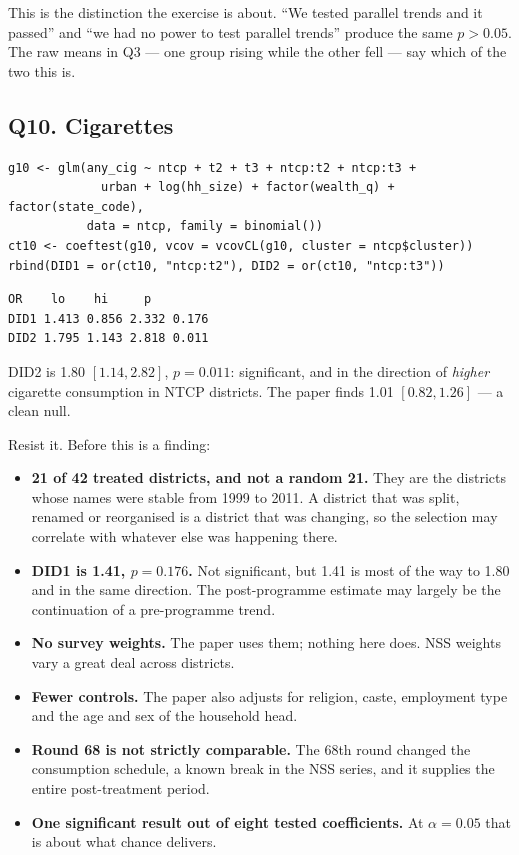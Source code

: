 \documentclass[11pt,a4paper]{article}
\newcommand{\qhead}[1]{\subsection*{#1}\addcontentsline{toc}{subsection}{#1}}
\begin{document}
This is the distinction the exercise is about. ``We tested parallel trends and
it passed'' and ``we had no power to test parallel trends'' produce the same
$p > 0.05$. The raw means in Q3 --- one group rising while the other fell ---
say which of the two this is.

\qhead{Q10. Cigarettes}

\begin{lstlisting}[style=rcode]
g10 <- glm(any_cig ~ ntcp + t2 + t3 + ntcp:t2 + ntcp:t3 +
             urban + log(hh_size) + factor(wealth_q) + factor(state_code),
           data = ntcp, family = binomial())
ct10 <- coeftest(g10, vcov = vcovCL(g10, cluster = ntcp$cluster))
rbind(DID1 = or(ct10, "ntcp:t2"), DID2 = or(ct10, "ntcp:t3"))
\end{lstlisting}

\begin{lstlisting}[style=rout]
        OR    lo    hi     p
DID1 1.413 0.856 2.332 0.176
DID2 1.795 1.143 2.818 0.011
\end{lstlisting}

DID2 is 1.80 $[1.14, 2.82]$, $p = 0.011$: significant, and in the direction of
\emph{higher} cigarette consumption in NTCP districts. The paper finds 1.01
$[0.82, 1.26]$ --- a clean null.

Resist it. Before this is a finding:

\begin{itemize}[leftmargin=*,itemsep=0.25em]
\item \textbf{21 of 42 treated districts, and not a random 21.} They are the
districts whose names were stable from 1999 to 2011. A district that was split,
renamed or reorganised is a district that was changing, so the selection may
correlate with whatever else was happening there.
\item \textbf{DID1 is 1.41, $p = 0.176$.} Not significant, but 1.41 is most of
the way to 1.80 and in the same direction. The post-programme estimate may
largely be the continuation of a pre-programme trend.
\item \textbf{No survey weights.} The paper uses them; nothing here does. NSS
weights vary a great deal across districts.
\item \textbf{Fewer controls.} The paper also adjusts for religion, caste,
employment type and the age and sex of the household head.
\item \textbf{Round 68 is not strictly comparable.} The 68th round changed the
consumption schedule, a known break in the NSS series, and it supplies the
entire post-treatment period.
\item \textbf{One significant result out of eight tested coefficients.} At
$\alpha = 0.05$ that is about what chance delivers.
\end{itemize}
\end{document}

